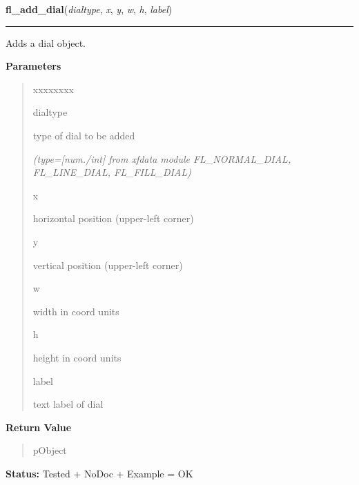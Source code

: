 \hspace{.8\funcindent}\begin{boxedminipage}{\funcwidth}

    \raggedright \textbf{fl\_add\_dial}(\textit{dialtype}, \textit{x}, \textit{y}, \textit{w}, \textit{h}, \textit{label})

    \vspace{-1.5ex}

    \rule{\textwidth}{0.5\fboxrule}
\setlength{\parskip}{2ex}
    Adds a dial object.

\setlength{\parskip}{1ex}
      \textbf{Parameters}
      \vspace{-1ex}

      \begin{quote}
        \begin{Ventry}{xxxxxxxx}

          \item[dialtype]

          type of dial to be added

            {\it (type=[num./int] from xfdata module FL\_NORMAL\_DIAL, FL\_LINE\_DIAL, 
FL\_FILL\_DIAL)}

          \item[x]

          horizontal position (upper-left corner)

          \item[y]

          vertical position (upper-left corner)

          \item[w]

          width in coord units

          \item[h]

          height in coord units

          \item[label]

          text label of dial

        \end{Ventry}

      \end{quote}

      \textbf{Return Value}
    \vspace{-1ex}

      \begin{quote}
      pObject

      \end{quote}

\textbf{Status:} Tested + NoDoc + Example = OK



    \end{boxedminipage}

